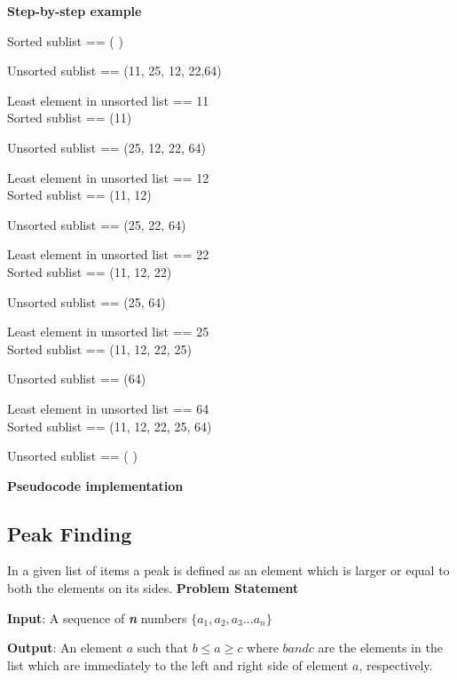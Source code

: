 \documentclass[12pt,a4paper]{book}
\begin{document}
\noindent \textbf {Step-by-step example} \\

\par
\begin{scriptsize} 
Sorted sublist == ( )\par
Unsorted sublist == (11, 25, 12, 22,64)\par
Least element in unsorted list == 11\\

Sorted sublist ==  (11)\par
Unsorted sublist == (25, 12, 22, 64)\par
Least element in unsorted list == 12\\

Sorted sublist == (11, 12)\par
Unsorted sublist == (25, 22, 64)\par
Least element in unsorted list == 22\\

Sorted sublist == (11, 12, 22)\par
Unsorted sublist == (25, 64)\par
Least element in unsorted list == 25\\

Sorted sublist == (11, 12, 22, 25)\par
Unsorted sublist == (64)\par
Least element in unsorted list == 64\\

Sorted sublist == (11, 12, 22, 25, 64)\par
Unsorted sublist == ( )\par
\end{scriptsize}

\noindent \textbf {Pseudocode implementation}

\subsection{Peak Finding}
In a given list of items a peak is defined as an element which is larger or equal to both the elements on its sides. 
\noindent \textbf {Problem Statement} \par
\textbf{Input}: A sequence of \textbf{\textit{n}} numbers $\{a_{1} , a_{2} , a_{3} ... a_{n} \}$\par 
\textbf{Output}: An element $a$  such that $b \leq a \geq c$ where $b and c$ are the elements in the list which are immediately to the left and right side of element $a$, respectively.
\end{document}
